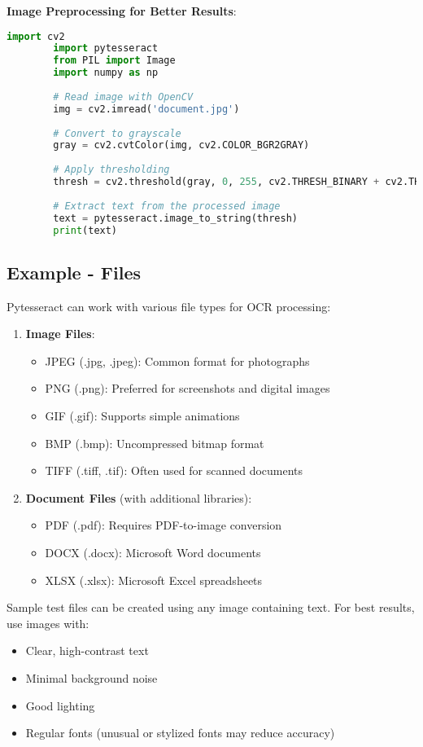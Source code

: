 \documentclass{article}
\begin{document}
	\textbf{Image Preprocessing for Better Results}:
	\begin{lstlisting}[language=Python]
		import cv2
		import pytesseract
		from PIL import Image
		import numpy as np
		
		# Read image with OpenCV
		img = cv2.imread('document.jpg')
		
		# Convert to grayscale
		gray = cv2.cvtColor(img, cv2.COLOR_BGR2GRAY)
		
		# Apply thresholding
		thresh = cv2.threshold(gray, 0, 255, cv2.THRESH_BINARY + cv2.THRESH_OTSU)[1]
		
		# Extract text from the processed image
		text = pytesseract.image_to_string(thresh)
		print(text)
	\end{lstlisting}
	
	\subsection{Example - Files}
	Pytesseract can work with various file types for OCR processing:
	
	\begin{enumerate}
		\item \textbf{Image Files}:
		\begin{itemize}
			\item JPEG (.jpg, .jpeg): Common format for photographs
			\item PNG (.png): Preferred for screenshots and digital images
			\item GIF (.gif): Supports simple animations
			\item BMP (.bmp): Uncompressed bitmap format
			\item TIFF (.tiff, .tif): Often used for scanned documents
		\end{itemize}
		
		\item \textbf{Document Files} (with additional libraries):
		\begin{itemize}
			\item PDF (.pdf): Requires PDF-to-image conversion
			\item DOCX (.docx): Microsoft Word documents
			\item XLSX (.xlsx): Microsoft Excel spreadsheets
		\end{itemize}
	\end{enumerate}
	
	Sample test files can be created using any image containing text. For best results, use images with:
	\begin{itemize}
		\item Clear, high-contrast text
		\item Minimal background noise
		\item Good lighting
		\item Regular fonts (unusual or stylized fonts may reduce accuracy) \cite {Betterpath:2023, GeekyAnts:2023}
	\end{itemize}
	
\end{document}

